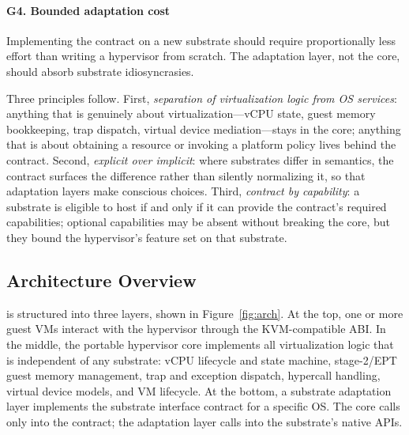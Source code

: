 \paragraph{G4. Bounded adaptation cost}
Implementing the contract on a new substrate should require proportionally less
effort than writing a hypervisor from scratch. The adaptation layer, not the
core, should absorb substrate idiosyncrasies.

Three principles follow. First, \emph{separation of virtualization logic from OS
services}: anything that is genuinely about virtualization---vCPU state, guest
memory bookkeeping, trap dispatch, virtual device mediation---stays in the core;
anything that is about obtaining a resource or invoking a platform policy lives
behind the contract. Second, \emph{explicit over implicit}: where substrates
differ in semantics, the contract surfaces the difference rather than silently
normalizing it, so that adaptation layers make conscious choices. Third,
\emph{contract by capability}: a substrate is eligible to host \axvisor{} if and
only if it can provide the contract's required capabilities; optional
capabilities may be absent without breaking the core, but they bound the
hypervisor's feature set on that substrate.

\subsection{Architecture Overview}
\label{sec:arch-overview}

\axvisor{} is structured into three layers, shown in Figure~\ref{fig:arch}. At
the top, one or more guest VMs interact with the hypervisor through the
KVM-compatible ABI. In the middle, the portable hypervisor core implements all
virtualization logic that is independent of any substrate: vCPU lifecycle and
state machine, stage-2/EPT guest memory management, trap and exception dispatch,
hypercall handling, virtual device models, and VM lifecycle. At the bottom, a
substrate adaptation layer implements the substrate interface contract for a
specific OS. The core calls only into the contract; the adaptation layer calls
into the substrate's native APIs.

